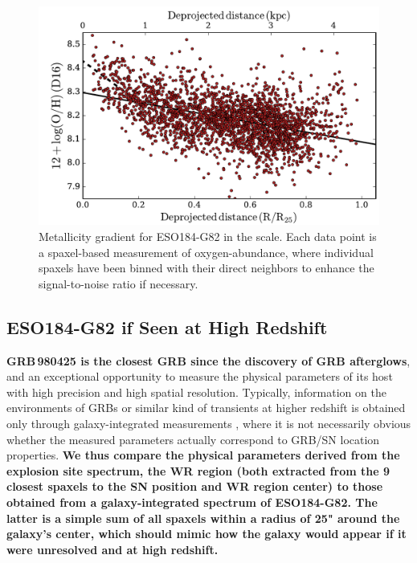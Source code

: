 \documentclass[traditabstract, referee]{aa}
\begin{document}
\begin{figure}
\includegraphics[angle=0, width=0.99\columnwidth]{Figs/MUSE_SN1998bw_metgrad.pdf}
\caption{Metallicity gradient for ESO184-G82 in  the \citet{2016Ap&SS.361...61D} scale. Each data point is a spaxel-based measurement of oxygen-abundance, where individual spaxels have been binned with their direct neighbors to enhance the signal-to-noise ratio if necessary.}
\label{fig:metgrad}
\end{figure}

\subsection{ESO184-G82 if Seen at High Redshift}
\label{sec:int}

\textbf{GRB\,980425 is the closest GRB since the discovery of GRB afterglows}, and an exceptional opportunity to measure the physical parameters of its host with high precision and high spatial resolution. Typically, information on the environments of GRBs or similar kind of transients at higher redshift is obtained only through galaxy-integrated measurements \citep{2015A&A...581A.125K, 2016A&A...590A.129J, 2017A&A...599A.120V}, where it is not necessarily obvious whether the measured parameters actually correspond to GRB/SN location properties. \textbf{We thus compare the physical parameters derived from the explosion site spectrum, the WR region (both extracted from the 9 closest spaxels to the SN position and WR region center) to those obtained from a galaxy-integrated spectrum of ESO184-G82. The latter is a simple sum of all spaxels within a radius of 25" around the galaxy's center, which should mimic how the galaxy would appear if it were unresolved and at high redshift.}
\end{document}
